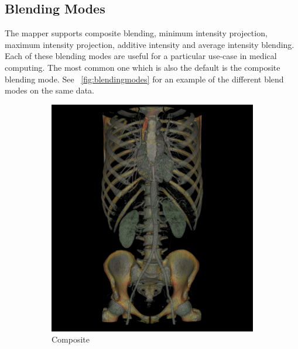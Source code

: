 \subsection{Blending Modes}
\label{blending-modes}
The mapper supports composite blending, minimum intensity projection, maximum
intensity projection, additive intensity and average intensity blending. Each of
these blending modes are useful for a particular use-case in medical computing.
The most common one which is also the default is the composite blending mode.
See ~\autoref{fig:blendingmodes} for an example of the different blend modes
on the same data.

\begin{figure}[htb]
  \centering
  \begin{subfigure}{.5\columnwidth}
    \includegraphics[width=\columnwidth]{TorsoBlendingComposite.png}
    \caption{Composite}
    \label{fig:blendcomposite}
  \end{subfigure}%
  \begin{subfigure}{.5\columnwidth}

\end{subfigure}
\end{figure}
